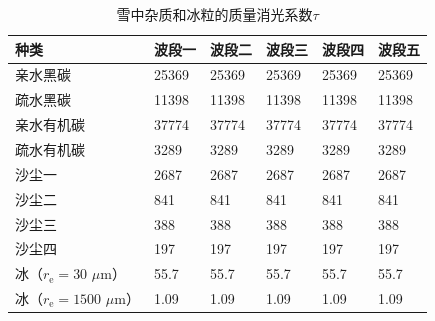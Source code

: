 \begin{table}[htbp]
  \centering
  \caption{雪中杂质和冰粒的质量消光系数$\tau$}
  \label{tab:积雪消光系数}
  \begin{tabular}{llllll}
    \toprule
    种类                                       & 波段一 & 波段二 & 波段三 & 波段四 & 波段五 \\ \midrule
    亲水黑碳                                   & 25369  & 25369  & 25369  & 25369  & 25369  \\
    疏水黑碳                                   & 11398  & 11398  & 11398  & 11398  & 11398  \\
    亲水有机碳                                 & 37774  & 37774  & 37774  & 37774  & 37774  \\
    疏水有机碳                                 & 3289   & 3289   & 3289   & 3289   & 3289   \\
    沙尘一                                     & 2687   & 2687   & 2687   & 2687   & 2687   \\
    沙尘二                                     & 841    & 841    & 841    & 841    & 841    \\
    沙尘三                                     & 388    & 388    & 388    & 388    & 388    \\
    沙尘四                                     & 197    & 197    & 197    & 197    & 197    \\
    冰（$r_{\mathrm e}=30$ $\mu\mathrm{m}$）   & 55.7   & 55.7   & 55.7   & 55.7   & 55.7   \\
    冰（$r_{\mathrm e}=1500$ $\mu\mathrm{m}$） & 1.09   & 1.09   & 1.09   & 1.09   & 1.09   \\ \bottomrule
  \end{tabular}
\end{table}

